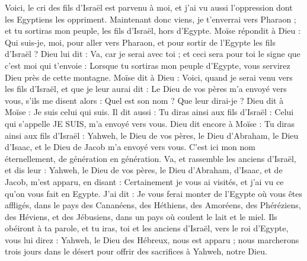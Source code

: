 \begin{multicols}{2}
Voici, le cri des fils d'Israël est parvenu à moi, et j'ai vu aussi l'oppression dont les Egyptiens les oppriment.
Maintenant donc viens, je t'enverrai vers Pharaon ; et tu sortiras mon peuple, les fils d'Israël, hors d'Egypte.
Moïse répondit à Dieu : Qui suis-je, moi, pour aller vers Pharaon, et pour sortir de l'Egypte les fils d'Israël ?
Dieu lui dit : Va, car je serai avec toi ; et ceci sera pour toi le signe que c’est moi qui t’envoie : Lorsque tu sortiras mon peuple d'Egypte, vous servirez Dieu près de cette montagne.
Moïse dit à Dieu : Voici, quand je serai venu vers les fils d'Israël, et que je leur aurai dit : Le Dieu de vos pères m'a envoyé vers vous, s'ils me disent alors : Quel est son nom ? Que leur dirai-je ?
Dieu dit à Moïse : Je suis celui qui suis. Il dit aussi : Tu diras ainsi aux fils d'Israël : Celui qui s'appelle JE SUIS, m'a envoyé vers vous.
Dieu dit encore à Moïse : Tu diras ainsi aux fils d'Israël : Yahweh, le Dieu de vos pères, le Dieu d'Abraham, le Dieu d'Isaac, et le Dieu de Jacob m'a envoyé vers vous. C'est ici mon nom éternellement, de génération en génération.
Va, et rassemble les anciens d'Israël, et dis leur : Yahweh, le Dieu de vos pères, le Dieu d'Abraham, d'Isaac, et de Jacob, m'est apparu, en disant : Certainement je vous ai visités, et j'ai vu ce qu'on vous fait en Egypte.
J'ai dit : Je vous ferai monter de l'Egypte où vous êtes affligés, dans le pays des Cananéens, des Héthiens, des Amoréens, des Phéréziens, des Héviens, et des Jébusiens, dans un pays où coulent le lait et le miel.
Ils obéiront à ta parole, et tu iras, toi et les anciens d'Israël, vers le roi d'Egypte, vous lui direz : Yahweh, le Dieu des Hébreux, nous est apparu ; nous marcherons trois jours dans le désert pour offrir des sacrifices à Yahweh, notre Dieu.

\end{multicols}
